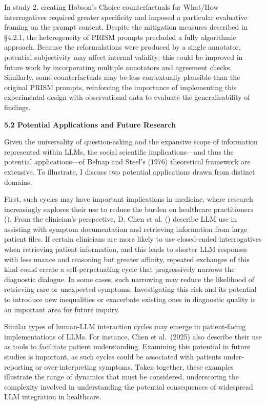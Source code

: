 \documentclass[
  12pt,
]{article}
\begin{document}
In study 2, creating Hobson's Choice counterfactuals for What/How interrogatives required greater specificity and imposed a particular evaluative framing on the prompt content. Despite the mitigation measures described in §4.2.1, the heterogeneity of PRISM prompts precluded a fully algorithmic approach. Because the reformulations were produced by a single annotator, potential subjectivity may affect internal validity; this could be improved in future work by incorporating multiple annotators and agreement checks. Similarly, some counterfactuals may be less contextually plausible than the original PRISM prompts, reinforcing the importance of implementing this experimental design with observational data to evaluate the generalisability of findings.

\textbf{5.2 Potential Applications and Future Research}

Given the universality of question-asking and the expansive scope of information represented within LLMs, the social scientific implications---and thus the potential applications---of Belnap and Steel's (1976) theoretical framework are extensive. To illustrate, I discuss two potential applications drawn from distinct domains.

First, such cycles may have important implications in medicine, where research increasingly explores their use to reduce the burden on healthcare practitioners (). From the clinician's perspective, D. Chen et al. () describe LLM use in assisting with symptom documentation and retrieving information from large patient files. If certain clinicians are more likely to use closed-ended interrogatives when retrieving patient information, and this leads to shorter LLM responses with less nuance and reasoning but greater affinity, repeated exchanges of this kind could create a self-perpetuating cycle that progressively narrows the diagnostic dialogue. In some cases, such narrowing may reduce the likelihood of retrieving rare or unexpected symptoms. Investigating this risk and its potential to introduce new inequalities or exacerbate existing ones in diagnostic quality is an important area for future inquiry.

Similar types of human-LLM interaction cycles may emerge in patient-facing implementations of LLMs. For instance, Chen et al.~(2025) also describe their use as tools to facilitate patient understanding. Examining this potential in future studies is important, as such cycles could be associated with patients under-reporting or over-interpreting symptoms. Taken together, these examples illustrate the range of dynamics that must be considered, underscoring the complexity involved in understanding the potential consequences of widespread LLM integration in healthcare.
\end{document}
